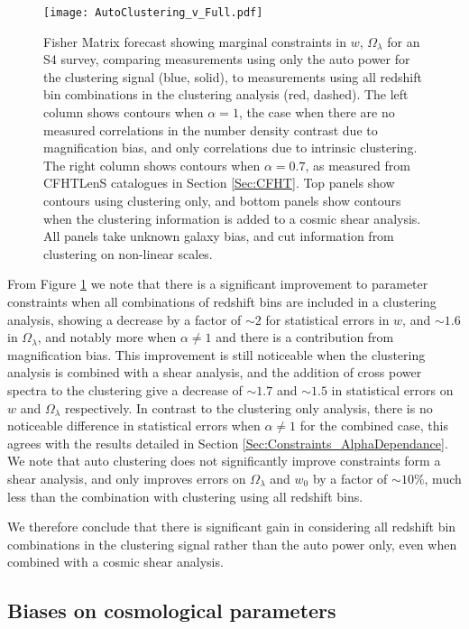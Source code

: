 \documentclass[useAMS,usenatbib,times,letter,amssymb]{mn2e}
\begin{document}
\begin{figure}
\centering
\texttt{[image: AutoClustering\_v\_Full.pdf]}
\caption{Fisher Matrix forecast showing marginal constraints in  $w$, $\Omega_\lambda$  for an S4 survey, comparing measurements using only the auto power for the clustering signal (blue, solid), to measurements using all redshift bin combinations in the clustering analysis (red, dashed). The left column shows contours when $\alpha = 1$, the case when there are no measured correlations in the number density contrast due to magnification bias, and only correlations due to intrinsic clustering. The right column shows contours when $\alpha = 0.7$, as measured from CFHTLenS catalogues in Section \ref{Sec:CFHT}. Top panels show contours using clustering only, and bottom panels show contours when the clustering information is added to a cosmic shear analysis. All panels take unknown galaxy bias, and cut information from clustering on non-linear scales.}\label{Fig:AutoClustering_v_Full}
\end{figure}


From Figure \ref{Fig:AutoClustering_v_Full} we note that there is a significant improvement to parameter constraints when all combinations of redshift bins are included in a clustering analysis, showing a decrease by a factor of $\sim 2$ for statistical errors in $w$, and $\sim 1.6$ in $\Omega_\lambda$, and notably more when $\alpha \ne 1$ and there is a contribution from magnification bias. This improvement is still noticeable when the clustering analysis is combined with a shear analysis, and the addition of cross power spectra to the clustering give a decrease of $\sim 1.7$ and $\sim 1.5$ in statistical errors on $w$ and $\Omega_\lambda$ respectively. In contrast to the clustering only analysis, there is no noticeable difference in statistical errors when $\alpha \ne 1$ for the combined case, this agrees with the results detailed in Section \ref{Sec:Constraints_AlphaDependance}. We note that auto clustering does not significantly improve constraints form a shear analysis, and only improves errors on $\Omega_\lambda$ and $w_0$ by a factor of $\sim 10\%$, much less than the combination with clustering using all redshift bins.

We therefore conclude that there is significant gain in considering all redshift bin combinations in the clustering signal rather than the auto power only, even when combined with a cosmic shear analysis.

\subsection{Biases on cosmological parameters}
\end{document}
